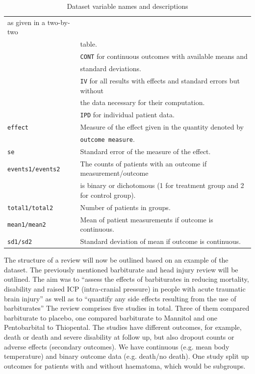 \documentclass[11pt,a4paper,twoside]{book}\usepackage[]{graphicx}\usepackage[]{color}
\begin{document}
\begin{table}[ht]
\begin{center}
\begin{tabular}{l l}
      as given in a two-by-two \\ &table. \\ &\texttt{CONT} for continuous outcomes with available means and \\ &standard deviations. \\ & \texttt{IV} for all results with effects and standard errors but without \\ & the data necessary for their computation. \\ &\texttt{IPD} for individual patient data.\\
      \texttt{effect} & Measure of the effect given in the quantity denoted by \\ &\texttt{outcome measure}.\\
      \texttt{se} & Standard error of the measure of the effect.\\
      \texttt{events1/events2} & The counts of patients with an outcome if measurement/outcome \\ &is binary or dichotomous (1 for treatment group and 2 for control group).\\
      \texttt{total1/total2} & Number of patients in groups.\\
      \texttt{mean1/mean2} & Mean of patient measurements if outcome is continuous.\\
      \texttt{sd1/sd2} & Standard deviation of mean if outcome is continuous.
    \end{tabular}
  \caption{Dataset variable names and descriptions  \label{variable}}
  \label{variable}
  \end{center}
\end{table}

\vspace{0mm}
The structure of a review will now be outlined based on an example of the dataset. The previously mentioned barbiturate and head injury review will be outlined. The aim was to ``assess the effects of barbiturates in reducing mortality, disability and raised ICP (intra-cranial pressure) in people with acute traumatic brain injury'' as well as to ``quantify any side effects resulting from the use of barbiturates'' %
The review comprises five studies in total. Three of them compared barbiturate to placebo, one compared barbiturate to Mannitol and one Pentobarbital to Thiopental. The studies have different outcomes, for example, death or death and severe disability at follow up, but also dropout counts or adverse effects (secondary outcomes). 
We have continuous (e.g. mean body temperature) and binary outcome data (e.g. death/no death). One study split up outcomes for patients with and without haematoma, which would be subgroups. %
\end{document}
